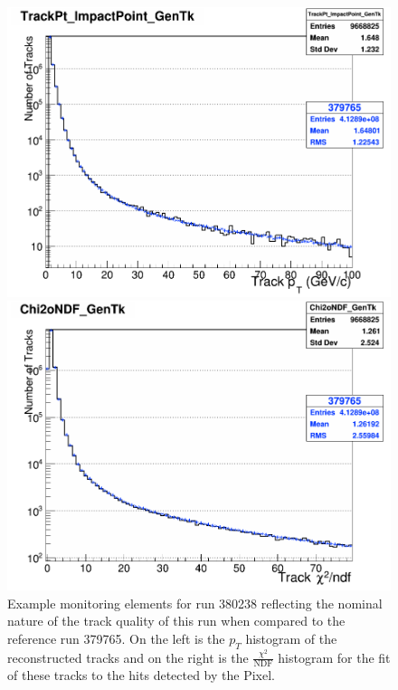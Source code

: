 \begin{figure}[h]
  \centering
  \begin{minipage}{0.45\textwidth}
    \centering
    \includegraphics[width=\textwidth]{images/trackpt380238.png}
  \end{minipage}
  \hfill
  \begin{minipage}{0.45\textwidth}
    \centering
    \includegraphics[width=\textwidth]{images/chi2ondf380238.png}
  \end{minipage}
  \caption{Example monitoring elements for run 380238 reflecting the nominal nature of the track quality of this run when compared to the reference run 379765. On the left is the $p_T$ histogram of the reconstructed tracks and on the right is the $\frac{\chi^2}{\text{NDF}}$ histogram for the fit of these tracks to the hits detected by the Pixel.} 
  \label{fig:380238trkqual}
\end{figure}


